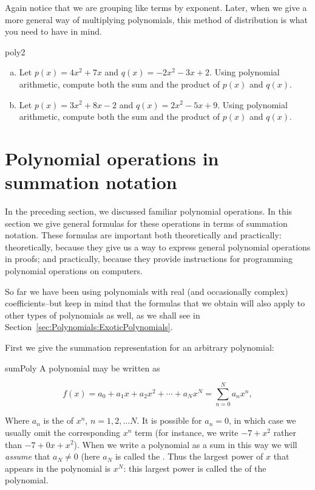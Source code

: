 Again notice that we are grouping like terms by exponent.  Later, when we give a more general way of multiplying polynomials, this method of distribution is what you need to have in mind.


\begin{exercise}{poly2}
\begin{enumerate}[(a)]
\item
Let $p(x)=4x^2+7x$ and $q(x)=-2x^2-3x+2$. Using polynomial arithmetic, compute both the sum and the product of $p(x)$ and $q(x)$.
\item
Let $p(x)=3x^2+8x-2$ and $q(x)=2x^2-5x+9$. Using polynomial arithmetic, compute both the sum and the product of $p(x)$ and $q(x)$. 
\end{enumerate}
\end{exercise}



\section{Polynomial operations in summation notation}
\label{sec:Polynomials:OperationsAndSigmaNotation}

In the preceding section, we discussed familiar polynomial operations. In this section we give general formulas for these operations in terms of summation notation. These formulas are important both theoretically and practically: theoretically, because they give us a way to express general polynomial operations in proofs; and practically, because they provide instructions for programming polynomial operations on computers.

So far we have been using polynomials with real (and occasionally complex) coefficients--but keep in mind that the formulas that we obtain will also apply to  other types of polynomials as well, as we shall see in Section~\ref{sec:Polynomials:ExoticPolynomials}. 

 First we give the summation representation for an arbitrary polynomial: 

\begin{defn}{sumPoly}  A polynomial may be written as

\[f(x) = a_0 + a_1 x +a_2 x^2 + \cdots + a_N x^N = \sum^{N}_{n=0} a_n x^n, \]

Where $a_n$  is the   of $x^n$,  $n=1,2, \ldots N$. It is possible for $a_n = 0$, in which case we usually omit the corresponding $x^n$ term (for instance, we write $-7 + x^2 $ rather than $-7 + 0x +  x^2  $). When we write a polynomial as a sum in this way we will \emph{assume} that $a_N \neq 0$ (here $a_N$ is called the .  Thus the largest power of $x$ that appears in the polynomial is $x^N$: this largest power is called the  of the polynomial.
\end{defn}

